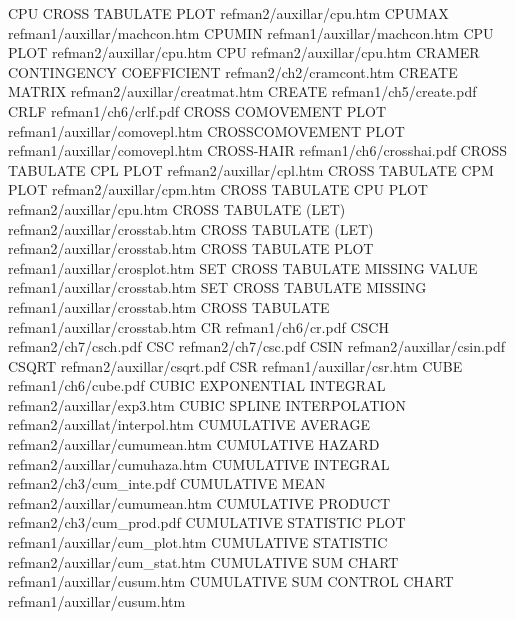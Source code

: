 CPU CROSS TABULATE PLOT                 refman2/auxillar/cpu.htm
CPUMAX                                  refman1/auxillar/machcon.htm
CPUMIN                                  refman1/auxillar/machcon.htm
CPU PLOT                                refman2/auxillar/cpu.htm
CPU                                     refman2/auxillar/cpu.htm
CRAMER CONTINGENCY COEFFICIENT          refman2/ch2/cramcont.htm
CREATE MATRIX                           refman2/auxillar/creatmat.htm
CREATE                                  refman1/ch5/create.pdf
CRLF                                    refman1/ch6/crlf.pdf
CROSS COMOVEMENT PLOT                   refman1/auxillar/comovepl.htm
CROSSCOMOVEMENT PLOT                    refman1/auxillar/comovepl.htm
CROSS-HAIR                              refman1/ch6/crosshai.pdf
CROSS TABULATE CPL PLOT                 refman2/auxillar/cpl.htm
CROSS TABULATE CPM PLOT                 refman2/auxillar/cpm.htm
CROSS TABULATE CPU PLOT                 refman2/auxillar/cpu.htm
CROSS TABULATE (LET)                    refman2/auxillar/crosstab.htm
CROSS TABULATE (LET)                    refman2/auxillar/crosstab.htm
CROSS TABULATE PLOT                     refman1/auxillar/crosplot.htm
SET CROSS TABULATE MISSING VALUE        refman1/auxillar/crosstab.htm
SET CROSS TABULATE MISSING              refman1/auxillar/crosstab.htm
CROSS TABULATE                          refman1/auxillar/crosstab.htm
CR                                      refman1/ch6/cr.pdf
CSCH                                    refman2/ch7/csch.pdf
CSC                                     refman2/ch7/csc.pdf
CSIN                                    refman2/auxillar/csin.pdf
CSQRT                                   refman2/auxillar/csqrt.pdf
CSR                                     refman1/auxillar/csr.htm
CUBE                                    refman1/ch6/cube.pdf
CUBIC EXPONENTIAL INTEGRAL              refman2/auxillar/exp3.htm
CUBIC SPLINE INTERPOLATION              refman2/auxillat/interpol.htm
CUMULATIVE AVERAGE                      refman2/auxillar/cumumean.htm
CUMULATIVE HAZARD                       refman2/auxillar/cumuhaza.htm
CUMULATIVE INTEGRAL                     refman2/ch3/cum_inte.pdf
CUMULATIVE MEAN                         refman2/auxillar/cumumean.htm
CUMULATIVE PRODUCT                      refman2/ch3/cum_prod.pdf
CUMULATIVE STATISTIC PLOT               refman1/auxillar/cum_plot.htm
CUMULATIVE STATISTIC                    refman2/auxillar/cum_stat.htm
CUMULATIVE SUM CHART                    refman1/auxillar/cusum.htm
CUMULATIVE SUM CONTROL CHART            refman1/auxillar/cusum.htm
